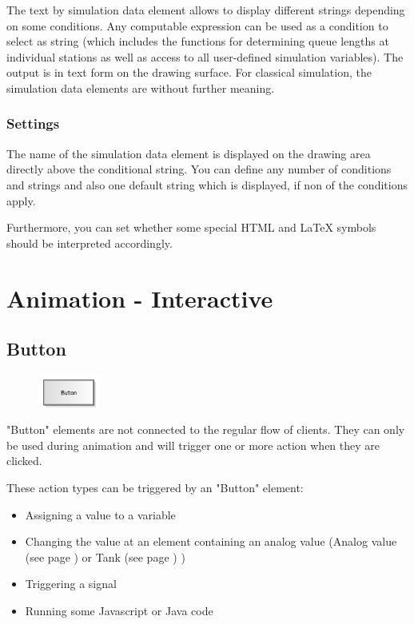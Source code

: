 The text by simulation data element allows to display different strings depending on some conditions.
Any computable expression can be used as a condition to select as string (which includes the functions for
determining queue lengths at individual stations as well as access to all user-defined simulation
variables). The output is in text form on the drawing surface. For classical simulation, the simulation
data elements are without further meaning.

\subsection*{Settings}

The name of the simulation data element is displayed on the drawing area directly above the conditional string.
You can define any number of conditions and strings and also one default string which is displayed,
if non of the conditions apply.

Furthermore, you can set whether some special HTML and LaTeX symbols should
be interpreted accordingly.





\chapter{Animation - Interactive}

\section{Button}
\label{ref:ModelElementInteractiveButton}

\begin{figure}
\vspace{-22pt}
\includegraphics[width=2cm]{imageModelElementInteractiveButton.png}
\vspace{-22pt}
\end{figure}

"Button" elements are not connected to the regular flow of clients.
They can only be used during animation and will trigger one or more
action when they are clicked.

These action types can be triggered by an "Button" element:

\begin{itemize}
  \item Assigning a value to a variable 
  \item Changing the value at an element containing an analog value
  (Analog value (see page \pageref{ref:ModelElementAnalogValue}) or Tank (see page \pageref{ref:ModelElementTank}) )
  \item Triggering a signal 
  \item Running some Javascript or Java code 
\end{itemize}

